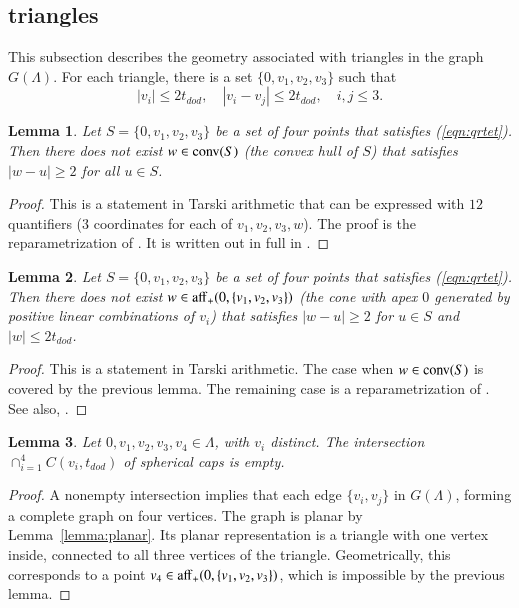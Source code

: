 \documentclass{article} %
\newtheorem{lemma}{Lemma}[subsection]
\begin{document}
\subsection{triangles}

This subsection describes the geometry associated with
triangles in the graph $G(\Lambda)$.  For each triangle,
there is a set $\{0,v_1,v_2,v_3\}$ such that
\begin{equation}\label{eqn:qrtet}
  |v_i| \le 2t_{dod},\quad |v_i-v_j | \le 2 t_{dod},\quad i,j\le 3.
\end{equation}

\begin{lemma} Let $S=\{0,v_1,v_2,v_3\}$ be a set of four points
that satisfies (\ref{eqn:qrtet}).  Then
there does not exist $w\in{\operatorname{conv}}(S)$
(the convex hull of $S$) that satisfies $|w-u|\ge 2$ for all
$u\in S$.
\end{lemma}

\begin{proof}  This is a statement in Tarski arithmetic 
that can be expressed with $12$ quantifiers ($3$ coordinates
for each of $v_1,v_2,v_3,w$).  The proof is
the reparametrization of \cite[Lemma~4.15]{DCG}.
It is written out in full in \cite[Lemma~3.3]{arx}.
\end{proof}

\begin{lemma}\label{lemma:enclosed} 
Let $S=\{0,v_1,v_2,v_3\}$ be a set of four points
that satisfies (\ref{eqn:qrtet}).  Then
there does not exist $w\in{\operatorname{aff}}_+(0,\{v_1,v_2,v_3\})$
(the cone with apex $0$ 
generated by positive linear combinations of $v_i$) 
that satisfies $|w-u|\ge 2$ for 
$u\in S$ and $|w|\le 2t_{dod}$.
\end{lemma}

\begin{proof} This is a statement in Tarski arithmetic.
The case when $w\in{\operatorname{conv}}(S)$ is covered by the previous lemma.
The remaining case is a reparametrization of
\cite[Lemma~4.19]{DCG}.  See also,  \cite[Cor~3.7]{arx}.
\end{proof}

\begin{lemma}\label{lemma:4fold}  
Let $0,v_1,v_2,v_3,v_4\in\Lambda$, with
$v_i$ distinct.  The intersection $\cap_{i=1}^4 C(v_i,t_{dod})$
of spherical caps is empty.
\end{lemma}

\begin{proof}  A nonempty intersection implies that each
edge $\{v_i,v_j\}$ in  $G(\Lambda)$, forming a complete graph
on four vertices.  The graph is planar by Lemma~\ref{lemma:planar}.
Its planar representation is a triangle with one vertex inside,
connected to all three vertices of the triangle.
Geometrically, this corresponds to a point $v_4\in{\operatorname{aff}}_+(0,\{v_1,v_2,v_3\})$, which is impossible by the previous lemma.
\end{proof}
\end{document}
